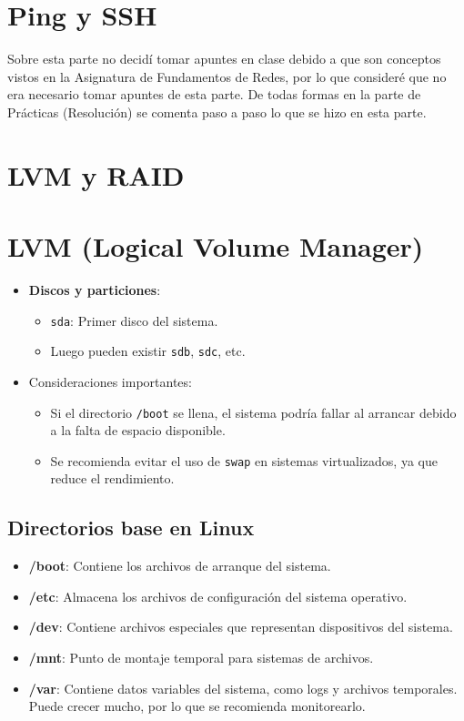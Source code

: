 \section{Ping y SSH}

Sobre esta parte no decidí tomar apuntes en clase debido a que son conceptos vistos en la Asignatura de Fundamentos de Redes, por lo que consideré que no era necesario tomar apuntes de esta parte. De todas formas en la parte de Prácticas (Resolución) se comenta paso a paso lo que se hizo en esta parte.

\section{LVM y RAID}

\section{LVM (Logical Volume Manager)}

\begin{itemize}
    \item \textbf{Discos y particiones}:
    \begin{itemize}
        \item \texttt{sda}: Primer disco del sistema.
        \item Luego pueden existir \texttt{sdb}, \texttt{sdc}, etc.
    \end{itemize}
    \item Consideraciones importantes:
    \begin{itemize}
        \item Si el directorio \texttt{/boot} se llena, el sistema podría fallar al arrancar debido a la falta de espacio disponible.
        \item Se recomienda evitar el uso de \texttt{swap} en sistemas virtualizados, ya que reduce el rendimiento.
    \end{itemize}
\end{itemize}

\subsection{Directorios base en Linux}
\begin{itemize}
    \item \textbf{/boot}: Contiene los archivos de arranque del sistema.
    \item \textbf{/etc}: Almacena los archivos de configuración del sistema operativo.
    \item \textbf{/dev}: Contiene archivos especiales que representan dispositivos del sistema.
    \item \textbf{/mnt}: Punto de montaje temporal para sistemas de archivos.
    \item \textbf{/var}: Contiene datos variables del sistema, como logs y archivos temporales. Puede crecer mucho, por lo que se recomienda monitorearlo.
\end{itemize}

